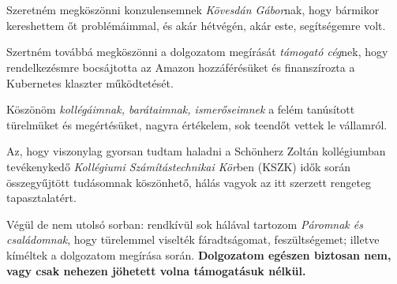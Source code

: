 
\chapter*{\koszonetnyilvanitas}

Szeretném megköszönni konzulensemnek \textit{Kövesdán Gábor}nak, hogy bármikor kereshettem őt problémáimmal, és akár hétvégén, akár este, segítségemre volt.

Szertném továbbá megköszönni a dolgozatom megírását \textit{támogató cég}nek, hogy rendelkezésmre bocsájtotta az Amazon hozzáférésüket és finanszírozta a Kubernetes klaszter működtetését.

Köszönöm \textit{kollégáimnak, barátaimnak, ismerőseimnek} a felém tanúsított türelmüket és megértésüket, nagyra értékelem, sok teendőt vettek le vállamról.

Az, hogy viszonylag gyorsan tudtam haladni a Schönherz Zoltán kollégiumban tevékenykedő \textit{Kollégiumi Számítástechnikai Kör}ben (KSZK) idők során összegyűjtött tudásomnak köszönhető, hálás vagyok az itt szerzett rengeteg tapasztalatért.

Végül de nem utolsó sorban: rendkívül sok hálával tartozom \textit{Páromnak és családomnak}, hogy türelemmel viselték fáradtságomat, feszültségemet; illetve kíméltek a dolgozatom megírása során.
\vskip 0.5in
\centering
\textbf{Dolgozatom egészen biztosan nem, vagy csak nehezen jöhetett volna támogatásuk nélkül.}